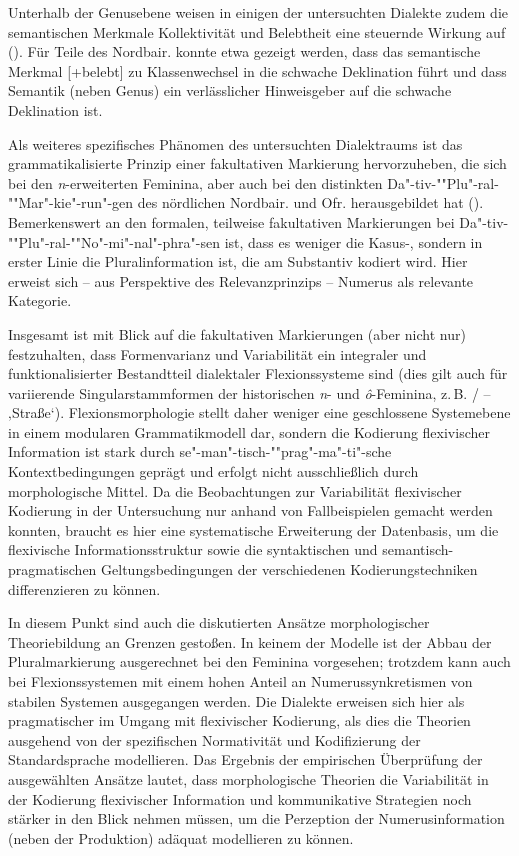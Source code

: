 Unterhalb der Genusebene weisen in einigen der untersuchten Dialekte zudem die semantischen Merkmale Kollektivität und Belebtheit eine steuernde Wirkung auf (). Für Teile des Nordbair. konnte etwa gezeigt werden, dass das semantische Merkmal [+belebt] zu Klassenwechsel in die schwache Deklination führt und dass Semantik (neben Genus) ein verlässlicher Hinweisgeber auf die schwache Deklination ist.

\begin{sloppypar}
Als weiteres spezifisches Phänomen des untersuchten Dialektraums ist das grammatikalisierte Prinzip einer fakultativen Markierung hervorzuheben, die sich bei den \textit{n}{}-erweiterten Feminina, aber auch bei den distinkten Da"-tiv-""Plu"-ral-""Mar"-kie"-run"-gen des nördlichen Nordbair. und Ofr. herausgebildet hat (). Bemerkenswert an den formalen, teilweise fakultativen Markierungen bei Da"-tiv-""Plu"-ral-""No"-mi"-nal"-phra"-sen ist, dass es weniger die Kasus-, sondern in erster Linie die Pluralinformation ist, die am Substantiv kodiert wird. Hier erweist sich -- aus Perspektive des Relevanzprinzips -- Numerus als relevante Kategorie.
\end{sloppypar}

Insgesamt ist mit Blick auf die fakultativen Markierungen (aber nicht nur) festzuhalten, dass Formenvarianz und Variabilität ein integraler und funktionalisierter Bestandtteil dialektaler Flexionssysteme sind (dies gilt auch für variierende Singularstammformen der historischen \textit{n}{}- und \textit{ô}{}-Feminina, z.\,B. \slash{} -- \mbox{} ‚Straße‘). Flexionsmorphologie stellt daher weniger eine geschlossene Systemebene in einem modularen Grammatikmodell dar, sondern die Kodierung flexivischer Information ist stark durch se"-man"-tisch-""prag"-ma"-ti"-sche Kontextbedingungen geprägt und erfolgt nicht ausschließlich durch morphologische Mittel. Da die Beobachtungen zur Variabilität flexivischer Kodierung in der Untersuchung nur anhand von Fallbeispielen gemacht werden konnten, braucht es hier eine systematische Erweiterung der Datenbasis, um die flexivische Informationsstruktur sowie die syntaktischen und semantisch-pragmatischen Geltungsbedingungen der verschiedenen Kodierungstechniken differenzieren zu können.\largerpage

In diesem Punkt sind auch die diskutierten Ansätze morphologischer Theoriebildung an Grenzen gestoßen. In keinem der Modelle ist der Abbau der Pluralmarkierung ausgerechnet bei den Feminina vorgesehen; trotzdem kann auch bei Flexionssystemen mit einem hohen Anteil an Numerussynkretismen von stabilen Systemen ausgegangen werden. Die Dialekte erweisen sich hier als pragmatischer im Umgang mit flexivischer Kodierung, als dies die Theorien ausgehend von der spezifischen Normativität und Kodifizierung der Standardsprache modellieren. Das Ergebnis der empirischen Überprüfung der ausgewählten Ansätze lautet, dass morphologische Theorien die Variabilität in der Kodierung flexivischer Information und kommunikative Strategien noch stärker in den Blick nehmen müssen, um die Perzeption der Numerusinformation (neben der Produktion) adäquat modellieren zu können.
